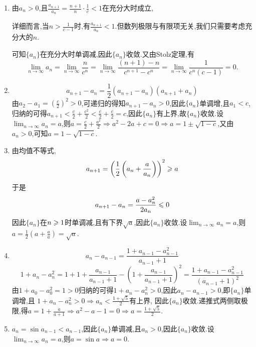 \begin{solution}
    \begin{enumerate}[(1)]
        \item 由$a_n > 0$,且$\frac{a_{n+1}}{a_n} = \frac{n+1}{n} \cdot \frac{1}{c} < 1$在充分大时成立,
              \begin{remark}
                  详细而言,当$n > \frac{1}{c-1}$时,有$\frac{a_{n+1}}{a_n} < 1$.但数列极限与有限项无关,我们只需要考虑充分大的$n$.
              \end{remark}
              可知$\{a_n\}$在充分大时单调减,因此$\{a_n\}$收敛.又由Stolz定理,有$$\lim_{n \to \infty} a_n = \lim_{n \to \infty} \frac{n}{c^n} = \lim_{n \to \infty} \frac{(n+1)-n}{c^{n+1}-c^n} = \lim_{n \to \infty} \frac{1}{c^n(c-1)} = 0.$$
        \item $$a_{n+1} - a_n = \frac{1}{2}(a_{n+1}-a_n)(a_{n+1}+a_n)$$
              由$a_2 - a_1 = \left( \frac{c}{2} \right)^2 > 0 $,可递归的得知$a_{n+1} - a_n > 0$,因此$\{a_n\}$单调增,且$a_1 < c$,归纳的可得$a_{n+1} < \frac{c}{2} + \frac{c^2}{2} < \frac{c}{2} + \frac{c}{2} = c$,因此$\{a_n\}$有上界,故$\{a_n\}$收敛.设$\lim_{n \to \infty} a_n = a$,则$a = \frac{c}{2} + \frac{a^2}{2} \Rightarrow a^2 - 2a + c = 0 \Rightarrow a = 1 \pm \sqrt{1-c}$,又由$a_n > 0$,可知$a = 1 - \sqrt{1-c}$.
        \item 由均值不等式,$$a_{n+1} = \left( \frac{1}{2} \left( a_n + \frac{a}{a_n} \right) \right)^2 \geqslant a$$
              于是
              $$a_{n+1} - a_n = \frac{a - a_n^2}{2a_n} \leqslant 0$$
              因此$\{a_n\}$在$n \geqslant 1$时单调减,且有下界$\sqrt{a}$,因此$\{a_n\}$收敛.设$\lim_{n \to \infty} a_n = a$,则$a = \frac{1}{2} \left( a + \frac{a}{a} \right) = \sqrt{a}$.
        \item $$a_n - a_{n-1} = \frac{1+ a_{n-1} - a_{n-1}^2}{a_{n-1} + 1} $$
              $$1 + a_n - a_n^2 = 1 + 1 + \frac{a_{n-1}}{a_{n-1} + 1} - \left( 1 + \frac{a_{n-1}}{a_{n-1} + 1} \right)^2 = \frac{1 + a_{n-1} - a_{n-1}^2}{(a_{n-1} + 1)^2}$$
              由$1+a_0 -a_0^2 = 1 > 0$归纳的可得$1 + a_n - a_n^2 > 0$,因此$a_n - a_{n-1} > 0$,即$\{a_n\}$单调增,且
              $1 + a_n - a_n^2 > 0 \Rightarrow a_n < \frac{1 + \sqrt{5}}{2}$有上界,
              因此$\{a_n\}$收敛.递推式两侧取极限,得$a = 1 + \frac{a}{a+1} \Rightarrow a^2 - a - 1 = 0 \Rightarrow a = \frac{1 + \sqrt{5}}{2}$.
        \item $a_n = \sin a_{n-1} < a_{n-1}$,因此$\{a_n\}$单调减,且$a_n > 0$,因此$\{a_n\}$收敛.设$\lim_{n \to \infty} a_n = a$,则$a = \sin a \Rightarrow a = 0$.
    \end{enumerate}
\end{solution}

